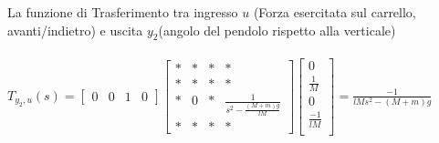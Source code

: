 La funzione di Trasferimento tra ingresso $u$ (Forza esercitata sul carrello, avanti/indietro) e uscita $y_2$(angolo del pendolo rispetto alla verticale)\\\\
$T_{y_2,u}(s)=
\begin{bmatrix}
0&0&1&0
\end{bmatrix}
\begin{bmatrix}
*&*&*&*\\
*&*&*&*\\
*&0&*&\displaystyle\frac{1}{s^2-\frac{(M+m)g}{lM}}\\
*&*&*&*
\end{bmatrix}
\begin{bmatrix}
0\\
\displaystyle\frac{1}{M}\\
0\\
\displaystyle\frac{-1}{lM}\\
\end{bmatrix}
=\displaystyle\frac{-1}{lMs^2-(M+m)g}
$




